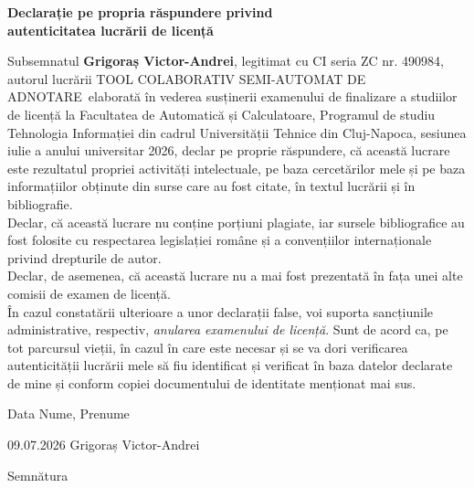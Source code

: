 \newpage
\begin{center}
	{\department}
\end{center}
\vspace{0.5cm}

\begin{center}
	{\bf Declarație pe propria răspundere privind\\ 
		autenticitatea lucrării de licență}
\end{center}
\vspace{1cm}

\begin{minipage}{\linewidth}
	Subsemnatul \textbf{Grigoraș Victor-Andrei}, legitimat cu CI seria ZC nr. 490984, autorul lucrării TOOL COLABORATIV SEMI-AUTOMAT DE ADNOTARE\
	elaborată în vederea susținerii examenului de finalizare a studiilor de licență la Facultatea de Automatică și Calculatoare, Programul de studiu Tehnologia Informației din cadrul Universității Tehnice din Cluj-Napoca, sesiunea iulie a anului universitar 2026, declar pe proprie răspundere, că această lucrare este rezultatul propriei activități intelectuale, pe baza cercetărilor mele și pe baza informațiilor obținute din surse care au fost citate, în textul lucrării și în bibliografie.\\
	Declar, că această lucrare nu conține porțiuni plagiate, iar sursele bibliografice au fost folosite cu respectarea legislației române și a convențiilor internaționale privind drepturile de autor.\\
	Declar, de asemenea, că această lucrare nu a mai fost prezentată în fața unei alte comisii de examen de licență.\\
	În cazul constatării ulterioare a unor declarații false, voi suporta sancțiunile administrative, respectiv, \emph{anularea examenului de licență}.
	Sunt de acord ca, pe tot parcursul vieții, în cazul în care este necesar și se va dori verificarea autenticității lucrării mele să fiu identificat și verificat în baza datelor declarate de mine și conform copiei documentului de identitate menționat mai sus.
\end{minipage}
\vspace{1.5cm}

Data \hspace{8cm} Nume, Prenume

\vspace{0.5cm}

09.07.2026 \hspace{6.5cm} Grigoraș Victor-Andrei

\vspace{1cm}
\hspace{9.4cm}Semnătura
\newpage

